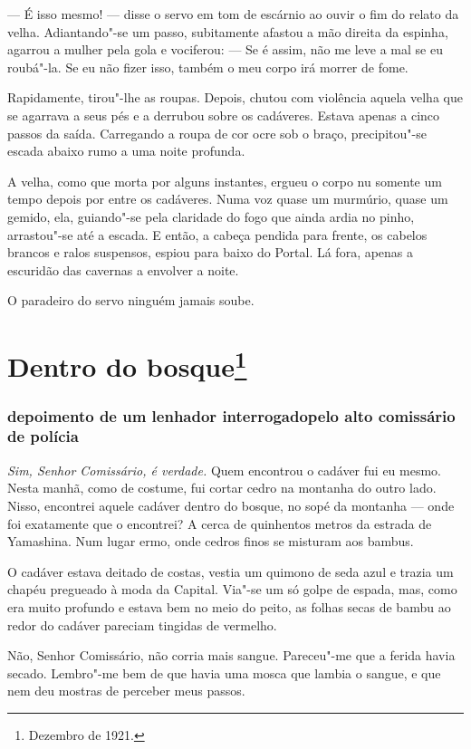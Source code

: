 --- É isso mesmo! --- disse o servo em tom de escárnio ao ouvir o fim do
relato da velha. Adiantando"-se um passo, subitamente afastou a mão
direita da espinha, agarrou a mulher pela gola e vociferou: --- Se é
assim, não me leve a mal se eu roubá"-la. Se eu não fizer isso, também o
meu corpo irá morrer de fome.

Rapidamente, tirou"-lhe as roupas. Depois, chutou com violência aquela
velha que se agarrava a seus pés e a derrubou sobre os cadáveres.
Estava apenas a cinco passos da saída. Carregando a roupa de cor ocre
sob o braço, precipitou"-se escada abaixo rumo a uma noite profunda.

A velha, como que morta por alguns instantes, ergueu o corpo nu somente
um tempo depois por entre os cadáveres. Numa voz quase um murmúrio,
quase um gemido, ela, guiando"-se pela claridade do fogo que ainda ardia
no pinho, arrastou"-se até a escada. E então, a cabeça pendida para
frente, os cabelos brancos e ralos suspensos, espiou para baixo do
Portal. Lá fora, apenas a escuridão das cavernas a envolver a noite.

O paradeiro do servo ninguém jamais soube.

\chapter{Dentro do bosque\footnote{Dezembro de 1921.}}

\subsection*{depoimento de um lenhador interrogado\break pelo alto comissário de polícia}

\textit{Sim, Senhor Comissário, é verdade.} Quem encontrou o cadáver fui eu mesmo. Nesta manhã, como de costume, fui
cortar cedro na montanha do outro lado. Nisso, encontrei aquele cadáver
dentro do bosque, no sopé da montanha --- onde foi exatamente que o
encontrei? A cerca de quinhentos metros da estrada de Yamashina. Num
lugar ermo, onde cedros finos se misturam aos bambus.

O cadáver estava deitado de costas, vestia um quimono de seda azul e
trazia um chapéu pregueado à moda da Capital. Via"-se um só golpe de
espada, mas, como era muito profundo e estava bem no meio do peito, as
folhas secas de bambu ao redor do cadáver pareciam tingidas de
vermelho.

 Não, Senhor Comissário, não corria mais sangue. Pareceu"-me que a ferida
havia secado. Lembro"-me bem de que havia uma mosca que lambia o sangue,
e que nem deu mostras de perceber meus passos.

